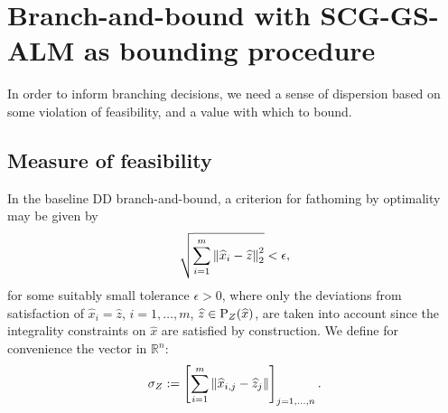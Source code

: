 
\section{Branch-and-bound with SCG-GS-ALM as bounding procedure}

In order to inform branching decisions, we need a sense of dispersion based on some violation of feasibility, and a value with which to bound.

\subsection{Measure of feasibility}

In the baseline DD branch-and-bound, a criterion for fathoming by optimality may be given by
\begin{equation}\label{FeasTolDDBasic}
\sqrt{\sum_{i=1}^m \left \| \widehat{x}_i-\widehat{z} \right \|_2^2} < \epsilon,
\end{equation}
for some suitably small tolerance $\epsilon > 0$,
where only the deviations from satisfaction of $\widehat{x}_i=\widehat{z}$, $i=1,\dots,m$, $\widehat{z} \in \text{P}_Z(\widehat{x})$, are taken into account since the integrality constraints on $\widehat{x}$ are satisfied by construction. We define for convenience the vector in $\mathbb{R}^n$:
$$
\sigma_Z:=\left[ \sum_{i=1}^m \left \| \widehat{x}_{i,j}-\widehat{z}_j \right \| \right]_{j=1,\dots,n}.
$$

